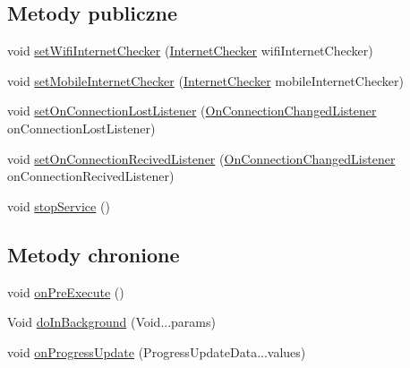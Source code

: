\subsection*{Metody publiczne}
\begin{DoxyCompactItemize}
\item 
void \hyperlink{classpl_1_1edu_1_1uwb_1_1mobiuwb_1_1connection_1_1_internet_checking_service_a76964a3cec3dac12c9046d697cca6cb0}{set\+Wifi\+Internet\+Checker} (\hyperlink{classpl_1_1edu_1_1uwb_1_1mobiuwb_1_1connection_1_1_internet_checker}{Internet\+Checker} wifi\+Internet\+Checker)
\item 
void \hyperlink{classpl_1_1edu_1_1uwb_1_1mobiuwb_1_1connection_1_1_internet_checking_service_af77f710f287ddf2b5c84ac6dbadd2e88}{set\+Mobile\+Internet\+Checker} (\hyperlink{classpl_1_1edu_1_1uwb_1_1mobiuwb_1_1connection_1_1_internet_checker}{Internet\+Checker} mobile\+Internet\+Checker)
\item 
void \hyperlink{classpl_1_1edu_1_1uwb_1_1mobiuwb_1_1connection_1_1_internet_checking_service_adf8a27c2227fc0d6c180e5e53757d0ee}{set\+On\+Connection\+Lost\+Listener} (\hyperlink{interfacepl_1_1edu_1_1uwb_1_1mobiuwb_1_1connection_1_1interfaces_1_1_on_connection_changed_listener}{On\+Connection\+Changed\+Listener} on\+Connection\+Lost\+Listener)
\item 
void \hyperlink{classpl_1_1edu_1_1uwb_1_1mobiuwb_1_1connection_1_1_internet_checking_service_a43e8395b5f489e4dc2437459eca89696}{set\+On\+Connection\+Recived\+Listener} (\hyperlink{interfacepl_1_1edu_1_1uwb_1_1mobiuwb_1_1connection_1_1interfaces_1_1_on_connection_changed_listener}{On\+Connection\+Changed\+Listener} on\+Connection\+Recived\+Listener)
\item 
void \hyperlink{classpl_1_1edu_1_1uwb_1_1mobiuwb_1_1connection_1_1_internet_checking_service_a5ec568bba346e9a9932182e5a2d660a9}{stop\+Service} ()
\end{DoxyCompactItemize}
\subsection*{Metody chronione}
\begin{DoxyCompactItemize}
\item 
void \hyperlink{classpl_1_1edu_1_1uwb_1_1mobiuwb_1_1connection_1_1_internet_checking_service_aecd31cf253320a20b0165e4f2e34cd29}{on\+Pre\+Execute} ()
\item 
Void \hyperlink{classpl_1_1edu_1_1uwb_1_1mobiuwb_1_1connection_1_1_internet_checking_service_a4046d1c4a3d83c6e3b14bbe03816af8e}{do\+In\+Background} (Void...\+params)
\item 
void \hyperlink{classpl_1_1edu_1_1uwb_1_1mobiuwb_1_1connection_1_1_internet_checking_service_add8a27840d56f7e64bae29664a186e57}{on\+Progress\+Update} (Progress\+Update\+Data...\+values)
\end{DoxyCompactItemize}


